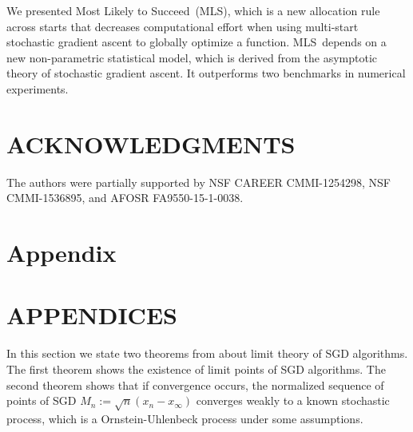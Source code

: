 \documentclass[12pt,english]{article}
\newcommand{\abbrv}{MLS}
\newcommand{\name}{Most Likely to Succeed}
\begin{document}
We presented \name\ (\abbrv), which is a new allocation rule across starts that decreases computational effort when using multi-start stochastic gradient ascent to globally optimize a function. \abbrv\ depends on a new non-parametric statistical model, which is derived from the asymptotic theory of stochastic gradient ascent. It outperforms two benchmarks in numerical experiments.
 
\section*{ACKNOWLEDGMENTS}
The authors were partially supported by NSF CAREER CMMI-1254298, NSF CMMI-1536895, and AFOSR FA9550-15-1-0038.






\appendix

\section*{Appendix}


\section{APPENDICES} 
\label{app:THEOREMS}

In this section we state two theorems from \cite{kushner} about limit theory of SGD algorithms. The first theorem shows the existence of limit points of SGD algorithms. The second theorem shows that if convergence occurs, the normalized sequence of points of SGD $M_{n}:=\sqrt{n}\left(x_{n}-x_{\infty}\right)$ converges weakly to a known stochastic process, which is a Ornstein-Uhlenbeck process under some assumptions. 
\end{document}
